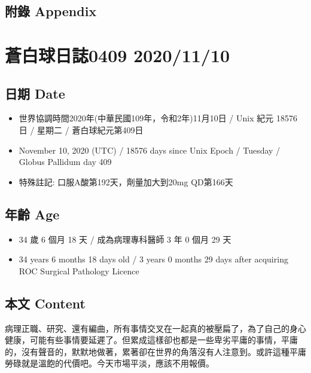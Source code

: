 \documentclass[a5paper, 11pt
]{book}
\providecommand{\tightlist}{%
  \setlength{\itemsep}{0pt}\setlength{\parskip}{0pt}}
\begin{document}
\hypertarget{ux9644ux9304-appendix-64}{%
\subsection{附錄 Appendix}\label{ux9644ux9304-appendix-64}}

\hypertarget{ux84bcux767dux7403ux65e5ux8a8c0409-20201110}{%
\section{蒼白球日誌0409
2020/11/10}\label{ux84bcux767dux7403ux65e5ux8a8c0409-20201110}}

\hypertarget{ux65e5ux671f-date-65}{%
\subsection{日期 Date}\label{ux65e5ux671f-date-65}}

\begin{itemize}
\tightlist
\item
  世界協調時間2020年(中華民國109年，令和2年)11月10日 / Unix 紀元 18576
  日 / 星期二 / 蒼白球紀元第409日
\item
  November 10, 2020 (UTC) / 18576 days since Unix Epoch / Tuesday /
  Globus Pallidum day 409
\item
  特殊註記: 口服A酸第192天，劑量加大到20mg QD第166天
\end{itemize}

\hypertarget{ux5e74ux9f61-age-65}{%
\subsection{年齡 Age}\label{ux5e74ux9f61-age-65}}

\begin{itemize}
\tightlist
\item
  34 歲 6 個月 18 天 / 成為病理專科醫師 3 年 0 個月 29 天
\item
  34 years 6 months 18 days old / 3 years 0 months 29 days after
  acquiring ROC Surgical Pathology Licence
\end{itemize}

\hypertarget{ux672cux6587-content-65}{%
\subsection{本文 Content}\label{ux672cux6587-content-65}}

病理正職、研究、還有編曲，所有事情交叉在一起真的被壓扁了，為了自己的身心健康，可能有些事情要延遲了。但累成這樣卻也都是一些卑劣平庸的事情，平庸的，沒有聲音的，默默地做著，累著卻在世界的角落沒有人注意到。或許這種平庸勞碌就是溫飽的代價吧。今天市場平淡，應該不用報價。
\end{document}
